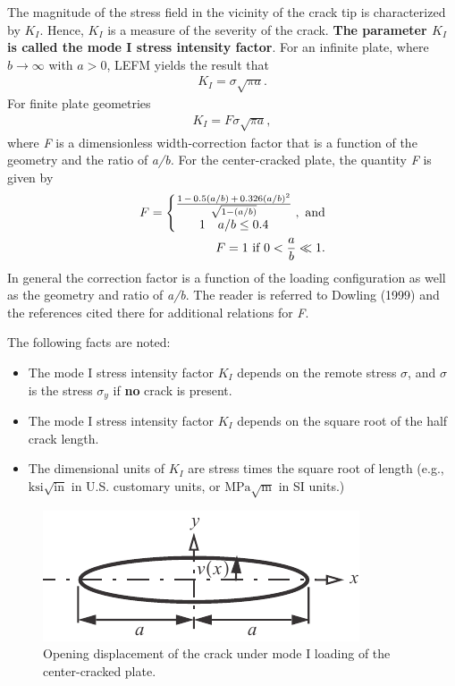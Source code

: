 \documentclass{AeroStructure-ERJohnson}
\begin{document}
The magnitude of the stress field in the vicinity of the crack tip is characterized by $K_{I}$. Hence, $K_{I}$ is a measure of the severity of the crack. \textbf{The parameter $K_{I}$ is called the mode I stress intensity factor}. For an infinite plate, where $b \rightarrow \infty$ with $a>0$, LEFM yields the result that
\begin{align}\label{eq13.8}
K_{I}=\sigma \sqrt{\pi a}.
\end{align}
For finite plate geometries
\begin{align}\label{eq13.9}
K_{I}=F \sigma \sqrt{\pi a},
\end{align}
where \textit{F} is a dimensionless width-correction factor that is a function of the geometry and the ratio of \textit{a/b. }For the center-cracked plate, the quantity \textit{F} is given by
\begin{align}
F=\left\{\begin{array}{@{}c@{}}\frac{1\,-\,0.5(a / b)\,+\,0.326(a / b)^{2}}{\sqrt{1-(a / b)}} \\1 \quad a / b \leq 0.4\end{array}\right. , \textrm{ and} \label{eq13.10} \\
F=1 \text { if } 0<\frac{a}{b} \ll 1. \label{eq13.11}
\end{align}
In general the correction factor is a function of the loading configuration as well as the geometry and ratio of\textit{ a/b}. The reader is referred to Dowling (1999) and the references cited there for additional relations for \textit{F}.

The following facts are noted:
\begin{itemize}
\item The mode I stress intensity factor $K_{I}$ depends on the remote stress $\sigma$, and $\sigma$ is the stress $\sigma_{y}$ if \textbf{no} crack is present.
\item The mode I stress intensity factor $K_{I}$ depends on the square root of the half crack length.
\item The dimensional units of $K_{I}$ are stress times the square root of length (e.g., $\mathrm{ksi} \sqrt{\mathrm{in}}$ in U.S. customary units, or $\mathrm{MPa} \sqrt{\mathrm{m}}$ in SI units.)
\end{itemize}

\begin{figure}[!h]
\centerline{\includegraphics{Figure_13-5.pdf}}
\caption{Opening displacement of the crack under mode I loading of the center-cracked plate.} \label{fig13.5}
\end{figure}
\end{document}
